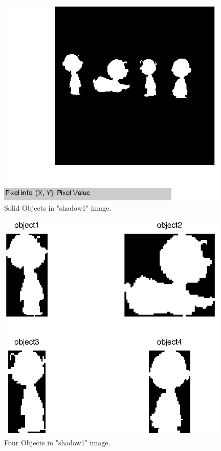 \documentclass[paper=a4, fontsize=11pt]{scrartcl}
\begin{document}
\begin{figure}
	\centering
	\includegraphics[width=11cm]{shadow1_solidpart.eps}
	\caption{Solid Objects in "shadow1" image. }
	\label{fig:23}
\end{figure}

\begin{figure}
	\centering
	\includegraphics[width=11cm]{4objectinshadow1.eps}
	\caption{ Four Objects in "shadow1" image. }
	\label{fig:24}
\end{figure}
\end{document}

